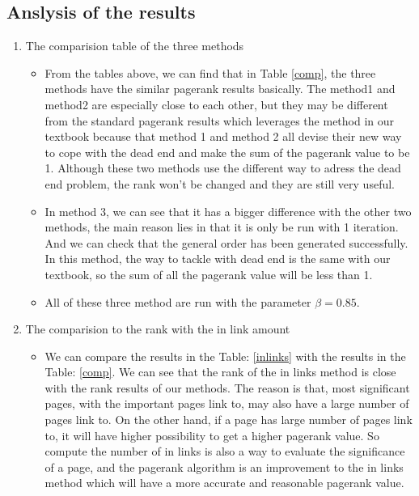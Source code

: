 \documentclass[a4paper]{article}
\begin{document}
\begin{center}
\begin{longtable}{|l|l|}
\end{longtable}
\end{center}

\subsection{Anslysis of the results}
\begin{enumerate}
	\item The comparision table of the three methods
	\begin{itemize}
		\item From the tables above, we can find that in Table \ref{comp}, the three methods have the similar pagerank results basically. The method1 and method2 are especially close to each other, but they may be different from the standard pagerank results which leverages the method in our textbook because that method 1 and method 2 all devise their new way to cope with the dead end and make the sum of the pagerank value to be 1. Although these two methods use the different way to adress the dead end problem, the rank won't be changed and they are still very useful. 
		\item In method 3, we can see that it has a bigger difference with the other two methods, the main reason lies in that it is only be run with 1 iteration. And we can check that the general order has been generated successfully. In this method, the way to tackle with dead end is the same with our textbook, so the sum of all the pagerank value will be less than 1.
		\item All of these three method are run with the parameter $\beta = 0.85$.
	\end{itemize}
	\item The comparision to the rank with the in link amount
	\begin{itemize}
		\item We can compare the results in the Table: \ref{inlinks} with the results in the Table: \ref{comp}. We can see that the rank of the in links method is close with the rank results of our methods. The reason is that, most significant pages, with the important pages link to, may also have a large number of pages link to. On the other hand, if a page has large number of pages link to, it will have higher possibility to get a higher pagerank value. So compute the number of in links is also a way to evaluate the significance of a page, and the pagerank algorithm is an improvement to the in links method which will have a more accurate and reasonable pagerank value. 
	\end{itemize}
\end{enumerate}
\end{document}
